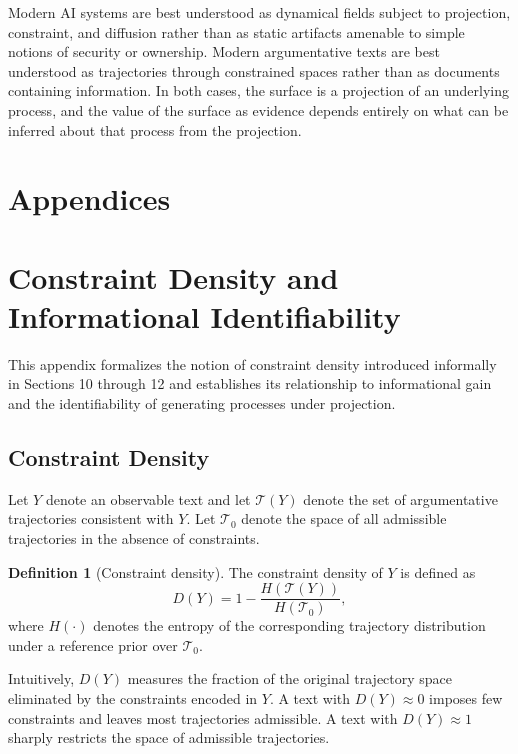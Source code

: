 \documentclass[12pt, oneside]{article}
\theoremstyle{plain}
\theoremstyle{definition}
\newtheorem{definition}[theorem]{Definition}
\theoremstyle{remark}
\begin{document}
Modern AI systems are best understood as dynamical fields subject to projection, constraint,
and diffusion rather than as static artifacts amenable to simple notions of security or
ownership. Modern argumentative texts are best understood as trajectories through constrained
spaces rather than as documents containing information. In both cases, the surface is a
projection of an underlying process, and the value of the surface as evidence depends
entirely on what can be inferred about that process from the projection.

\newpage 
\section*{Appendices}

\appendix
\section{Constraint Density and Informational Identifiability}

This appendix formalizes the notion of constraint density introduced informally in
Sections 10 through 12 and establishes its relationship to informational gain and
the identifiability of generating processes under projection.

\subsection{Constraint Density}

Let $Y$ denote an observable text and let $\mathcal{T}(Y)$ denote the set of
argumentative trajectories consistent with $Y$. Let $\mathcal{T}_0$ denote the
space of all admissible trajectories in the absence of constraints.

\begin{definition}[Constraint density]
The constraint density of $Y$ is defined as
\[
  D(Y) = 1 - \frac{H(\mathcal{T}(Y))}{H(\mathcal{T}_0)},
\]
where $H(\cdot)$ denotes the entropy of the corresponding trajectory distribution
under a reference prior over $\mathcal{T}_0$.
\end{definition}

Intuitively, $D(Y)$ measures the fraction of the original trajectory space eliminated
by the constraints encoded in $Y$. A text with $D(Y) \approx 0$ imposes few constraints
and leaves most trajectories admissible. A text with $D(Y) \approx 1$ sharply restricts
the space of admissible trajectories.
\end{document}
